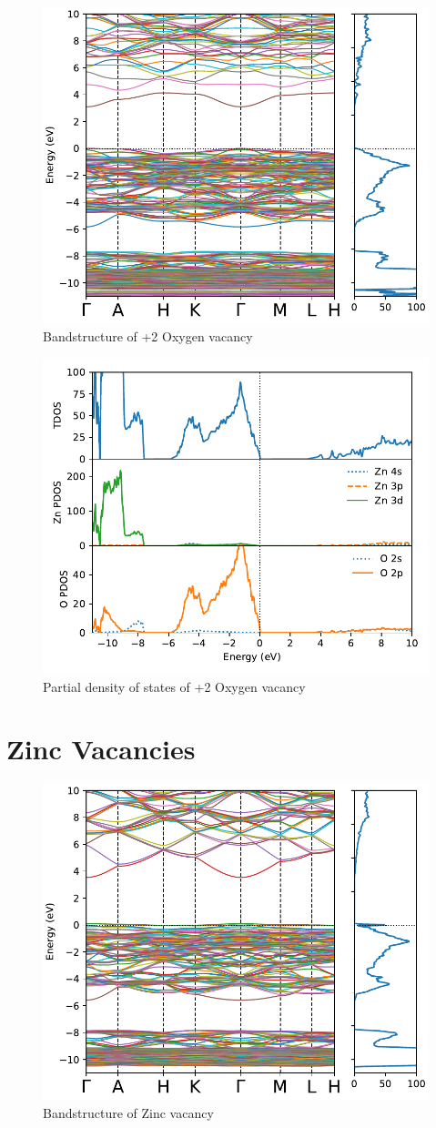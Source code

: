 \begin{figure}[tbh!]
	\centering
	\includegraphics[width=0.6\linewidth]{"images/rnd/band-dos_O_vac-p2"}
	\caption[Bandstructure of +2 Oxygen vacancy]{Bandstructure of +2 Oxygen vacancy}
\end{figure}

\begin{figure}[tbh!]
	\centering
	\includegraphics[width=0.6\linewidth]{"images/rnd/dos-pdos_O_vac-p2"}
	\caption[Partial density of states of +2 Oxygen vacancy]{Partial density of states of +2 Oxygen vacancy}
\end{figure}

\clearpage


\section{Zinc Vacancies}
\begin{figure}[tbh!]
	\centering
	\includegraphics[width=0.6\linewidth]{"images/rnd/band-dos_Zn_vac"}
	\caption[Bandstructure of Zinc vacancy]{Bandstructure of Zinc vacancy}
\end{figure}

